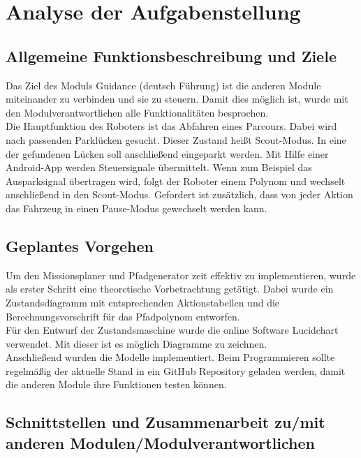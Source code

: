 \chapter{Analyse der Aufgabenstellung}


\section{Allgemeine Funktionsbeschreibung und Ziele}

Das Ziel des Moduls Guidance (deutsch Führung) ist die anderen Module miteinander zu verbinden und sie zu steuern. 
Damit dies möglich ist, wurde mit den Modulverantwortlichen alle Funktionalitäten besprochen. \\

\noindent Die Hauptfunktion des Roboters ist das Abfahren eines Parcours. Dabei wird nach passenden Parklücken gesucht. Dieser Zustand heißt Scout-Modus.
In eine der gefundenen Lücken soll anschließend eingeparkt werden. Mit Hilfe einer Android-App werden Steuersignale übermittelt. Wenn zum Beispiel das Ausparksignal übertragen wird, folgt der Roboter einem Polynom und wechselt anschließend in den Scout-Modus. Gefordert ist zusätzlich, dass von jeder Aktion das Fahrzeug in einen Pause-Modus gewechselt werden kann.

\section{Geplantes Vorgehen}

Um den Missionsplaner und Pfadgenerator zeit effektiv zu implementieren, wurde als erster Schritt eine theoretische Vorbetrachtung getätigt. Dabei wurde ein Zustandsdiagramm mit entsprechenden Aktionstabellen und die Berechnungsvorschrift für das Pfadpolynom entworfen. \\
\noindent Für den Entwurf der Zustandsmaschine wurde die online Software Lucidchart verwendet. Mit dieser ist es möglich Diagramme zu zeichnen. \\

\noindent Anschließend wurden die Modelle implementiert. Beim Programmieren sollte regelmäßig der aktuelle Stand in ein \glqq GitHub Repository\grqq{} geladen werden, damit die anderen Module ihre Funktionen testen können.

\section{Schnittstellen und Zusammenarbeit zu/mit anderen Modulen/Modulverantwortlichen}

